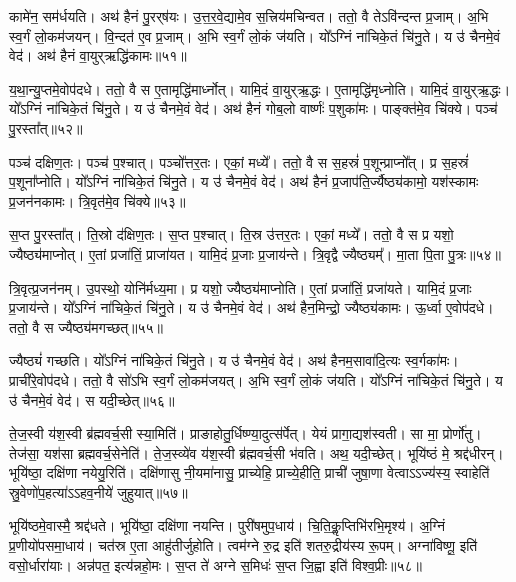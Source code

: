    कामे॑न॒ सम॑र्धयति।
   अथ॑ हैनं पु॒रर्{‌}ष॑यः।
   उ॒त्त॒र॒वे॒द्यामे॒व स॒त्त्रिय॑मचिन्वत।
   ततो॒ वै तेऽवि॑न्दन्त प्र॒जाम्।
   अ॒भि स्व॒र्गं लो॒कम॑जयन्।
   वि॒न्दत॑ ए॒व प्र॒जाम्।
   अ॒भि स्व॒र्गं लो॒कं ज॑यति।
   यो᳚ऽग्निं ना॑चिके॒तं चि॑नु॒ते।
   य उ॑ चैनमे॒वं वेद॑।
   अथ॑ हैनं वा॒युर्{‌}ऋद्धि॑कामः॥५१॥

   य॒था॒न्यु॒प्तमे॒वोप॑दधे।
   ततो॒ वै स ए॒तामृद्धि॑मार्ध्नोत्।
   यामि॒दं वा॒युर्{‌}ऋ॒द्धः।
   ए॒तामृद्धि॑मृध्नोति।
   यामि॒दं वा॒युर्{‌}ऋ॒द्धः।
   यो᳚ऽग्निं ना॑चिके॒तं चि॑नु॒ते।
   य उ॑ चैनमे॒वं वेद॑।
   अथ॑ हैनं गोब॒लो वार्ष्णः॑ प॒शुका॑मः।
   पाङ्क्त॑मे॒व चि॑क्ये।
   पञ्च॑ पु॒रस्ता᳚त्॥५२॥

   पञ्च॑ दक्षिण॒तः।
   पञ्च॑ प॒श्चात्।
   पञ्चो᳚त्तर॒तः।
   एकां॒ मध्ये᳚।
   ततो॒ वै स स॒हस्रं॑ प॒शून्प्राप्नो᳚त्।
   प्र स॒हस्रं॑ प॒शूना᳚प्नोति।
   यो᳚ऽग्निं ना॑चिके॒तं चि॑नु॒ते।
   य उ॑ चैनमे॒वं वेद॑।
   अथ॑ हैनं प्र॒जाप॑ति॒र्ज्यैष्ठ्य॑कामो॒ यश॑स्कामः प्र॒जन॑नकामः।
   त्रि॒वृत॑मे॒व चि॑क्ये॥५३॥

   स॒प्त पु॒रस्ता᳚त्।
   ति॒स्रो द॑क्षिण॒तः।
   स॒प्त प॒श्चात्।
   ति॒स्र उ॑त्तर॒तः।
   एकां॒ मध्ये᳚।
   ततो॒ वै स प्र यशो॒ ज्यैष्ठ्य॑माप्नोत्।
   ए॒तां प्रजा॑तिं॒ प्राजा॑यत।
   यामि॒दं प्र॒जाः प्र॒जाय॑न्ते।
   त्रि॒वृद्वै ज्यैष्ठ्यम्᳚।
   मा॒ता पि॒ता पु॒त्रः॥५४॥

   त्रि॒वृत्प्र॒जन॑नम्।
   उ॒पस्थो॒ योनि॑र्मध्य॒मा।
   प्र यशो॒ ज्यैष्ठ्य॑माप्नोति।
   ए॒तां प्रजा॑तिं॒ प्रजा॑यते।
   यामि॒दं प्र॒जाः प्र॒जाय॑न्ते।
   यो᳚ऽग्निं ना॑चिके॒तं चि॑नु॒ते।
   य उ॑ चैनमे॒वं वेद॑।
   अथ॑ हैन॒मिन्द्रो॒ ज्यैष्ठ्य॑कामः।
   ऊ॒र्ध्वा ए॒वोप॑दधे।
   ततो॒ वै स ज्यैष्ठ्य॑मगच्छत्॥५५॥

   ज्यैष्ठ्यं॑ गच्छति।
   यो᳚ऽग्निं ना॑चिके॒तं चि॑नु॒ते।
   य उ॑ चैनमे॒वं वेद॑।
   अथ॑ हैनम॒सावा॑दि॒त्यः स्व॒र्गका॑मः।
   प्राची॑रे॒वोप॑दधे।
   ततो॒ वै सो॑ऽभि स्व॒र्गं लो॒कम॑जयत्।
   अ॒भि स्व॒र्गं लो॒कं ज॑यति।
   यो᳚ऽग्निं ना॑चिके॒तं चि॑नु॒ते।
   य उ॑ चैनमे॒वं वेद॑।
   स यदी॒च्छेत्॥५६॥

   ते॒ज॒स्वी य॑श॒स्वी ब्र॑ह्मवर्च॒सी स्या॒मिति॑।
   प्राङाहोतु॒र्धिष्ण्या॒\-दुत्स॑र्पेत्।
   येयं प्रागा॒द्यश॑स्वती।
   सा मा॒ प्रोर्णो॑तु।
   तेज॑सा॒ यश॑सा ब्रह्मवर्च॒सेनेति॑।
   ते॒ज॒स्व्ये॑व य॑श॒स्वी ब्र॑ह्मवर्च॒सी भ॑वति।
   अथ॒ यदी॒च्छेत्।
   भूयि॑ष्ठं मे॒ श्रद्द॑धीरन्।
   भूयि॑ष्ठा॒ दक्षि॑णा नयेयु॒रिति॑।
   दक्षि॑णासु नी॒यमा॑नासु॒ प्राच्येहि॒ प्राच्ये॒हीति॒ प्राची॑ जुषा॒णा वेत्वाऽऽज्य॑स्य॒ स्वाहेति॑ स्रु॒वेणो॑प॒हत्या॑ऽऽहव॒नीये॑ जुहुयात्॥५७॥

   भूयि॑ष्ठमे॒वास्मै॒ श्रद्द॑धते।
   भूयि॑ष्ठा॒ दक्षि॑णा नयन्ति।
   पुरी॑षमुप॒धाय॑।
   चि॒ति॒कॢ॒प्तिभि॑रभि॒मृश्य॑।
   अ॒ग्निं प्र॒णीयो॑प\-समा॒धाय॑।
   चत॑स्र ए॒ता आहु॑तीर्जुहोति।
   त्वम॑ग्ने रु॒द्र इति॑ शतरु॒द्रीय॑स्य रू॒पम्।
   अग्ना॑विष्णू॒ इति॑ वसो॒र्धारा॑याः।
   अन्न॑पत॒ इत्य॑न्नहो॒मः।
   स॒प्त ते॑ अग्ने स॒मिधः॑ स॒प्त जि॒ह्वा इति॑ विश्व॒प्रीः॥५८॥
\anuvakamend
  
